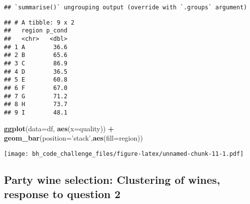 \documentclass[
]{article}
\newenvironment{Shaded}{\begin{snugshade}}{\end{snugshade}}
\newcommand{\DataTypeTok}[1]{\textcolor[rgb]{0.13,0.29,0.53}{#1}}
\newcommand{\KeywordTok}[1]{\textcolor[rgb]{0.13,0.29,0.53}{\textbf{#1}}}
\newcommand{\NormalTok}[1]{#1}
\newcommand{\OperatorTok}[1]{\textcolor[rgb]{0.81,0.36,0.00}{\textbf{#1}}}
\newcommand{\StringTok}[1]{\textcolor[rgb]{0.31,0.60,0.02}{#1}}
\begin{document}
\begin{verbatim}
## `summarise()` ungrouping output (override with `.groups` argument)
\end{verbatim}

\begin{verbatim}
## # A tibble: 9 x 2
##   region p_cond
##   <chr>   <dbl>
## 1 A        36.6
## 2 B        65.6
## 3 C        86.9
## 4 D        36.5
## 5 E        60.8
## 6 F        67.0
## 7 G        71.2
## 8 H        73.7
## 9 I        48.1
\end{verbatim}

\begin{Shaded}
\begin{Highlighting}[]
\KeywordTok{ggplot}\NormalTok{(}\DataTypeTok{data=}\NormalTok{df, }\KeywordTok{aes}\NormalTok{(}\DataTypeTok{x=}\NormalTok{quality)) }\OperatorTok{+}\StringTok{ }\KeywordTok{geom_bar}\NormalTok{(}\DataTypeTok{position=}\StringTok{'stack'}\NormalTok{,}\KeywordTok{aes}\NormalTok{(}\DataTypeTok{fill=}\NormalTok{region)) }
\end{Highlighting}
\end{Shaded}

\texttt{[image: bh\_code\_challenge\_files/figure-latex/unnamed-chunk-11-1.pdf]}

\hypertarget{party-wine-selection-clustering-of-wines-response-to-question-2}{%
\subsection{Party wine selection: Clustering of wines, response to
question
2}\label{party-wine-selection-clustering-of-wines-response-to-question-2}}
\end{document}
